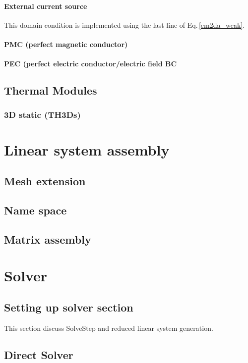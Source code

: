 \documentclass[11pt,a4paper,draft]{report}
\begin{document}
 \subsubsection{External current source}
 This domain condition is implemented using the last line of Eq.\,\ref{em2da_weak}. 
 
 \subsubsection{PMC (perfect magnetic conductor)}
 
 \subsubsection{PEC (perfect electric conductor/electric field BC}
  
  
\section{Thermal Modules}
\subsection{3D static (TH3Ds)}


\chapter{Linear system assembly}
\section{Mesh extension} 
\section{Name space}
\section{Matrix assembly}

\chapter{Solver}
\section{Setting up solver section}
This section discuss SolveStep and reduced linear system generation.

\section{Direct Solver}
\end{document}
